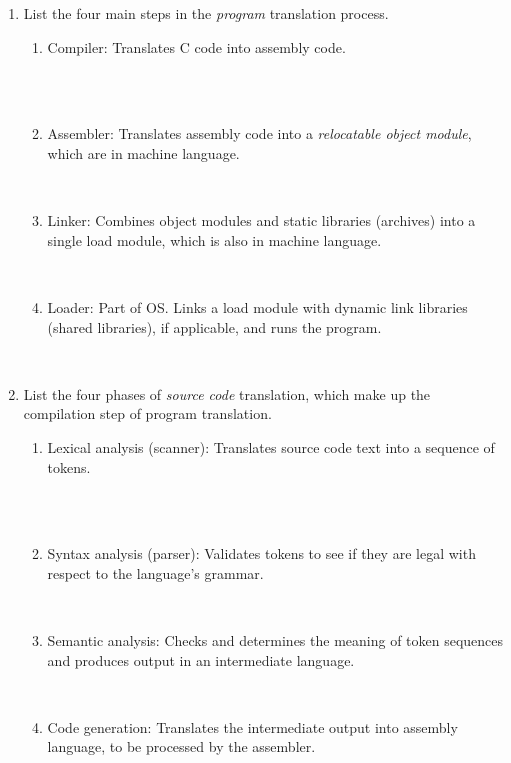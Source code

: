 \begin{enumerate}
	\item List the four main steps in the {\it program} translation process.
	\begin{enumerate}
		\item \begin{answer}Compiler: Translates C code into assembly code.\end{answer}\\ \\
		\item \begin{answer}Assembler: Translates assembly code into a {\it relocatable object module}, which are in machine language.\end{answer}\\
		\item \begin{answer}Linker: Combines object modules and static libraries (archives) into a single load module, which is also in machine language.\end{answer}\\
		\item \begin{answer}Loader: Part of OS. Links a load module with dynamic link libraries (shared libraries), if applicable, and runs the program.\end{answer}\\
	\end{enumerate}

	\item List the four phases of {\it source code} translation, which make up the compilation step of program translation.
	\begin{enumerate}
		\item \begin{answer}Lexical analysis (scanner): Translates source code text into a sequence of tokens.\end{answer}\\ \\
		\item \begin{answer}Syntax analysis (parser): Validates tokens to see if they are legal with respect to the language's grammar.\end{answer}\\
		\item \begin{answer}Semantic analysis: Checks and determines the meaning of token sequences and produces output in an intermediate language.\end{answer}\\
		\item \begin{answer}Code generation: Translates the intermediate output into assembly language, to be processed by the assembler.\end{answer}\\
	\end{enumerate}
\end{enumerate}